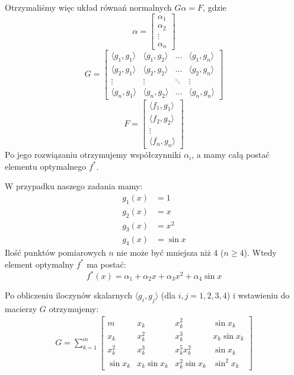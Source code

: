\documentclass[12pt]{article}
\begin{document}
	Otrzymaliśmy więc układ równań normalnych $G \alpha = F$, gdzie
	\begin{equation*}
		\alpha =
		\begin{bmatrix}
			\alpha_1 \\
			\alpha_2 \\
			\vdots   \\
			\alpha_n
		\end{bmatrix}
	\end{equation*}
	\begin{equation*}
		G =
		\begin{bmatrix}
			\langle g_1, g_1 \rangle & \langle g_1, g_2 \rangle & \dots  & \langle g_1, g_n \rangle \\
			\langle g_2, g_1 \rangle & \langle g_2, g_2 \rangle & \dots  & \langle g_2, g_n \rangle \\
			\vdots                   & \vdots                   & \ddots & \vdots                   \\
			\langle g_n, g_1 \rangle & \langle g_n, g_2 \rangle & \dots  & \langle g_n, g_n \rangle
		\end{bmatrix}
	\end{equation*}
	\begin{equation*}
		F =
		\begin{bmatrix}
			\langle f_1, g_1 \rangle \\
			\langle f_2, g_2 \rangle \\
			\vdots                   \\
			\langle f_n, g_n \rangle
		\end{bmatrix}
	\end{equation*}
	Po jego rozwiązaniu otrzymujemy współczynniki $\alpha_i$, a mamy całą postać elementu optymalnego $f^*$.



	W przypadku naszego zadania mamy:
	\begin{align*}
	g_1(x) &= 1\\
	g_2(x) &= x\\
	g_3(x) &= x^2\\
	g_4(x) &= \sin x
	\end{align*}
	Ilość punktów pomiarowych $n$ nie może być mniejsza niż 4 ($n \geq 4$). Wtedy element optymalny $f^*$ ma postać:
	$$
	f^*(x) = \alpha_1 + \alpha_2 x + \alpha_3 x^2 + \alpha_4 \sin x
	$$
	
	Po obliczeniu iloczynów skalarnych $\langle g_i, g_j \rangle$ (dla $i, j = 1, 2, 3, 4$) i wstawieniu do macierzy $G$ otrzymujemy:
	\begin{align*}
		G = \sum_{k=1}^{m}
		\begin{bmatrix}
			m        & x_k          & x_k^2          & \sin x_k     \\
			x_k      & x_k^2        & x_k^3          & x_k \sin x_k \\
			x_k^2    & x_k^3        & x_k^5 x_k^2    & \sin x_k     \\
			\sin x_k & x_k \sin x_k & x_k^2 \sin x_k & \sin^2 x_k
		\end{bmatrix}
	\end{align*}
	
\end{document}
